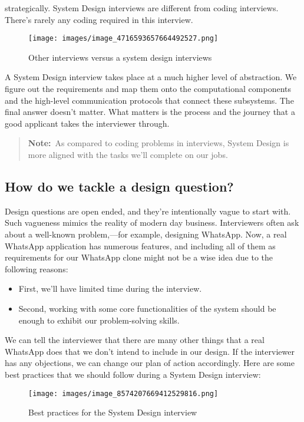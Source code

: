 strategically. System Design interviews are different from coding interviews. There's rarely any coding required in this interview.

\begin{figure}[htbp]
    \centering
    \texttt{[image: images/image\_4716593657664492527.png]}
    \caption{Other interviews versus a system design interviews}
\end{figure}

A System Design interview takes place at a much higher level of abstraction. We figure out the requirements and map them onto the computational components and the high-level communication protocols that connect these subsystems. The final answer doesn't matter. What matters is the process and the journey that a good applicant takes the interviewer through. \begin{quote} \textbf{Note:}~As compared to coding problems in interviews, System Design is more aligned with the tasks we'll complete on our jobs. \end{quote} \subsection{How do we tackle a design question?}\label{V2_cowfLOR7_6lrU-55Oc} Design questions are open ended, and they're intentionally vague to start with. Such vagueness mimics the reality of modern day business. Interviewers often ask about a well-known problem,---for example, designing WhatsApp. Now, a real WhatsApp application has numerous features, and including all of them as requirements for our WhatsApp clone might not be a wise idea due to the following reasons: \begin{itemize} \item {}\label{0uEfb-y7Eteyhlt2HMQKn} First, we'll have limited time during the interview. \item {}\label{TGDVjaDwtQ0YTnO7z7MNh} Second, working with some core functionalities of the system should be enough to exhibit our problem-solving skills. \end{itemize} We can tell the interviewer that there are many other things that a real WhatsApp does that we don't intend to include in our design. If the interviewer has any objections, we can change our plan of action accordingly. Here are some best practices that we should follow during a System Design interview:

\begin{figure}[htbp]
    \centering
    \texttt{[image: images/image\_8574207669412529816.png]}
    \caption{Best practices for the System Design interview}
\end{figure}

